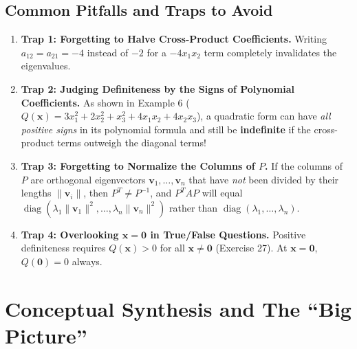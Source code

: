 \documentclass[11pt, letterpaper]{article}
\theoremstyle{definition}
\theoremstyle{remark}
\begin{document}
\subsection{Common Pitfalls and Traps to Avoid}
\begin{enumerate}
    \item \textbf{Trap 1: Forgetting to Halve Cross-Product Coefficients.} Writing $a_{12} = a_{21} = -4$ instead of $-2$ for a $-4x_1x_2$ term completely invalidates the eigenvalues.
    \item \textbf{Trap 2: Judging Definiteness by the Signs of Polynomial Coefficients.} As shown in Example 6 ($Q(\mathbf{x}) = 3x_1^2 + 2x_2^2 + x_3^2 + 4x_1x_2 + 4x_2x_3$), a quadratic form can have \textit{all positive signs} in its polynomial formula and still be \textbf{indefinite} if the cross-product terms outweigh the diagonal terms!
    \item \textbf{Trap 3: Forgetting to Normalize the Columns of $P$.} If the columns of $P$ are orthogonal eigenvectors $\mathbf{v}_1, \dots, \mathbf{v}_n$ that have \textit{not} been divided by their lengths $\|\mathbf{v}_i\|$, then $P^T \neq P^{-1}$, and $P^T A P$ will equal $\operatorname{diag}(\lambda_1 \|\mathbf{v}_1\|^2, \dots, \lambda_n \|\mathbf{v}_n\|^2)$ rather than $\operatorname{diag}(\lambda_1, \dots, \lambda_n)$.
    \item \textbf{Trap 4: Overlooking $\mathbf{x} = \mathbf{0}$ in True/False Questions.} Positive definiteness requires $Q(\mathbf{x}) > 0$ for all $\mathbf{x} \neq \mathbf{0}$ (Exercise 27). At $\mathbf{x} = \mathbf{0}$, $Q(\mathbf{0}) = 0$ always.
\end{enumerate}

\newpage
\section{Conceptual Synthesis and The ``Big Picture''}
\end{document}
